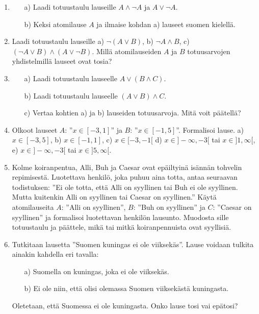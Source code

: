 \begin{enumerate}
\item 
\begin{itemize}
\item[a)] Laadi totuustaulu lauseille $A\land \lnot A$ ja $A\lor \lnot A$.
\item[b)] Keksi atomilause $A$ ja ilmaise kohdan a) lauseet suomen kielellä.
\end{itemize}

\item
Laadi totuustaulu lauseille a) $\lnot(A\lor B)$,  b)  $\lnot A\land B$,  c) $ (\lnot A\lor B)\land (A\lor \lnot B)$. Millä atomilauseiden $A$ ja  $B$ totuusarvojen yhdistelmillä lauseet ovat tosia?

\item
\begin{itemize}
\item[a)] Laadi totuustaulu lauseelle $A\lor (B\land C)$.  
\item[b)] Laadi totuustaulu lauseelle $(A\lor B)\land C$. 
\item[c)] Vertaa kohtien a) ja b) lauseiden totuusarvoja. Mitä voit päätellä?
\end{itemize}

\item Olkoot lauseet $A$: ''$x\in [-3,1]$'' ja $B$: ''$ x \in [-1,5]$''. Formalisoi lause.
a) $x\in [-3,5]$, b) $x\in [-1,1]$,   c)  $x\in [-3,-1[$  d)  $x\in ]-\infty,-3[$  tai $x\in ]1,\infty[$, 
e) $x\in]-\infty,-3[$  tai $x\in ]5,\infty[$.  

\item Kolme koiranpentua, Alli, Buh ja Caesar ovat epäiltyinä isännän tohvelin repimisestä. Luotettava henkilö, joka puhuu aina totta, antaa seuraavan todistuksen: ''Ei ole totta, että Alli on syyllinen tai Buh ei ole syyllinen. Mutta kuitenkin Alli on syyllinen tai Caesar on syyllinen.'' Käytä atomilauseita $A$: ''Alli on syyllinen'', $B$: ''Buh on syyllinen'' ja $C$: ''Caesar on syyllinen'' ja formalisoi luotettavan henkilön lausunto. Muodosta sille totuustaulu ja päättele, mikä tai mitkä koiranpennuista ovat syyllisiä. 

\item Tutkitaan lausetta ''Suomen kuningas ei ole viiksekäs''. Lause voidaan tulkita ainakin kahdella eri tavalla:
\begin{itemize}
\item[a)] Suomella on kuningas, joka ei ole viiksekäs.
\item[b)] Ei ole niin, että olisi olemassa Suomen viiksekästä kuningasta.
\end{itemize}
Oletetaan, että Suomessa ei ole kuningasta. Onko lause tosi vai epätosi?


\end{enumerate}
